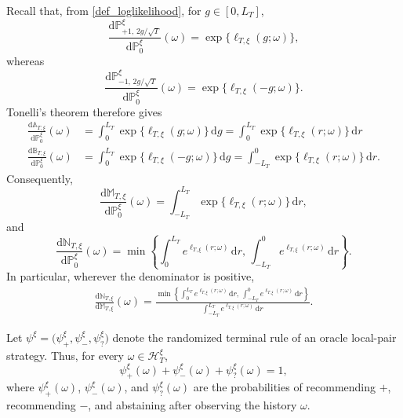 \documentclass[10pt]{article}
\newcommand{\dd}{\mathrm{d}}
\theoremstyle{plain}
\begin{document}
Recall that, from \eqref{def_loglikelihood}, for $g\in[0,L_T]$,
\[
    \frac{
        \dd\mathbb P_{+1,\,2g/\sqrt T}^{\xi}
    }{
        \dd\mathbb P_0^\xi
    }(\omega)
    =
    \exp\{\ell_{T,\xi}(g;\omega)\},
\]
whereas
\[
    \frac{
        \dd\mathbb P_{-1,\,2g/\sqrt T}^{\xi}
    }{
        \dd\mathbb P_0^\xi
    }(\omega)
    =
    \exp\{\ell_{T,\xi}(-g;\omega)\}.
\]
Tonelli's theorem therefore gives
\begin{equation}
\label{eq:mixture-likelihood-densities-transfer-lower}
\begin{aligned}
    \frac{\dd\mathbb A_{T,\xi}}
         {\dd\mathbb P_0^\xi}(\omega)
    &=
    \int_0^{L_T}
        \exp\{\ell_{T,\xi}(g;\omega)\}
    \,\dd g
    =\int_{0}^{L_T}
        \exp\{\ell_{T,\xi}(r;\omega)\}
    \,\dd r\\
    \frac{\dd\mathbb B_{T,\xi}}
         {\dd\mathbb P_0^\xi}(\omega)
    &=
    \int_0^{L_T}
        \exp\{\ell_{T,\xi}(-g;\omega)\}
    \,\dd g
    =
    \int_{-L_T}^{0}
        \exp\{\ell_{T,\xi}(r;\omega)\}
    \,\dd r.
\end{aligned}
\end{equation}
Consequently,
\[
    \frac{\dd\mathbb M_{T,\xi}}
         {\dd\mathbb P_0^\xi}(\omega)
    =
    \int_{-L_T}^{L_T}
        \exp\{\ell_{T,\xi}(r;\omega)\}
    \,\dd r,
\]
and
\[
    \frac{\dd\mathbb N_{T,\xi}}
         {\dd\mathbb P_0^\xi}(\omega)
    =
    \min\left\{
        \int_0^{L_T}
            e^{\ell_{T,\xi}(r;\omega)}
        \,\dd r,\,
        \int_{-L_T}^{0}
            e^{\ell_{T,\xi}(r;\omega)}
        \,\dd r
    \right\}.
\]
In particular, wherever the denominator is positive,
\begin{equation}
\label{eq:overlap-ratio-likelihood-transfer-lower}
\begin{aligned}
    \frac{\dd\mathbb N_{T,\xi}}
         {\dd\mathbb M_{T,\xi}}(\omega)
    =
    \frac{
        \min\left\{
            \displaystyle
            \int_0^{L_T}
                e^{\ell_{T,\xi}(r;\omega)}
            \,\dd r,\,
            \displaystyle
            \int_{-L_T}^{0}
                e^{\ell_{T,\xi}(r;\omega)}
            \,\dd r
        \right\}
    }{
        \displaystyle
        \int_{-L_T}^{L_T}
            e^{\ell_{T,\xi}(r;\omega)}
        \,\dd r
    }.
\end{aligned}
\end{equation}



Let
    $\psi^\xi
    =
    \bigl(
        \psi_+^\xi,\psi_-^\xi,\psi_?^\xi
    \bigr)$
denote the randomized terminal rule of an oracle local-pair strategy. Thus,
for every $\omega\in\mathcal H_T^\xi$,
\[
    \psi_+^\xi(\omega)
    +
    \psi_-^\xi(\omega)
    +
    \psi_?^\xi(\omega)
    =
    1,
\]
where $\psi_+^\xi(\omega)$, $\psi_-^\xi(\omega)$, and
$\psi_?^\xi(\omega)$ are the probabilities of recommending $+$,
recommending $-$, and abstaining after observing the history $\omega$.
\end{document}
